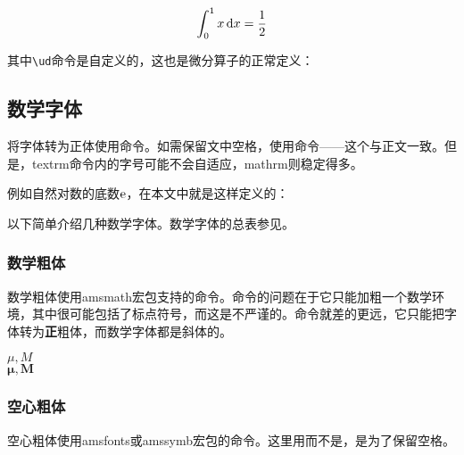 {\begin{codeshow}
\[ \int_0^1 x \ud{}x
= \frac{1}{2} \]
\end{codeshow}

其中\verb|\ud|命令是自定义的，这也是微分算子的正常定义\label{cmd:ud}：
\begin{latex}{}
\newcommand{\ud}{\mathop{}\negthinspace\mathrm{d}}
\end{latex}

\subsection{数学字体}
将字体转为正体使用\latexline{\\mathrm}命令。如需保留文中空格，使用\latexline{\\textrm}命令——这个与正文一致。但是，textrm命令内的字号可能不会自适应，mathrm则稳定得多。

例如自然对数的底数$\ue$，在本文中就是这样定义的：
\begin{latex}{}
\newcommand{\ue}{\mathrm{e}}
\end{latex}

以下简单介绍几种数学字体。数学字体的总表参见。

\subsubsection{数学粗体}
数学粗体使用amsmath宏包支持的\latexline{\\boldsymbol}命令。命令\latexline{\\boldmath}的问题在于它只能加粗一个数学环境，其中很可能包括了标点符号，而这是不严谨的。命令\latexline{\\mathbf}就差的更远，它只能把字体转为\textbf{正}粗体，而数学字体都是斜体的。

\begin{codeshow}
$\mu,M$\\
$\boldsymbol{\mu},
\boldsymbol{M}$ \\
\end{codeshow}

\subsubsection{空心粗体}
空心粗体使用amsfonts或amssymb宏包的\latexline{\\mathbb}命令。这里用\latexline{\\textrm}而不是\latexline{\\mathrm}，是为了保留空格。

}
